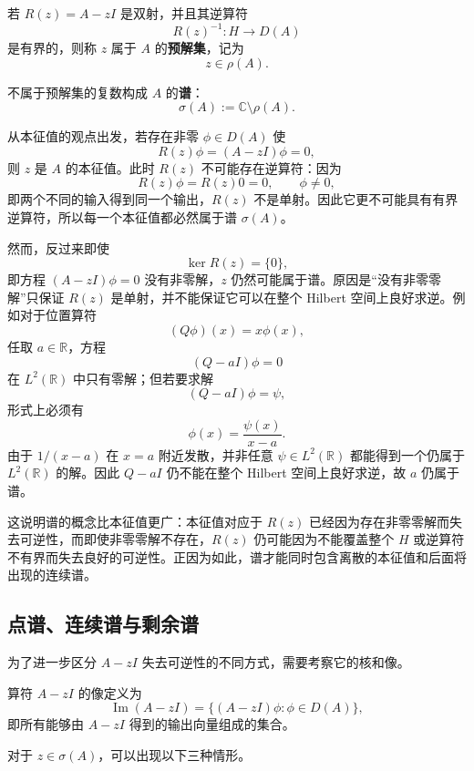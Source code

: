 \documentclass[UTF8,a4paper,11pt,openany]{ctexbook}
\begin{document}
\begin{definition}[预解集]
若 $R(z)=A-zI$ 是双射，并且其逆算符
\begin{equation}
    R(z)^{-1}:H\to D(A)
\end{equation}
是有界的，则称 $z$ 属于 $A$ 的\textbf{预解集}，记为
\[
z\in\rho(A).
\]
\end{definition}

\begin{definition}[谱]
不属于预解集的复数构成 $A$ 的\textbf{谱}：
\begin{equation}
    \sigma(A)
    :=
    \mathbb C\setminus\rho(A).
\end{equation}
\end{definition}

从本征值的观点出发，若存在非零 $\phi\in D(A)$ 使
\[
R(z)\phi=(A-zI)\phi=0,
\]
则 $z$ 是 $A$ 的本征值。此时 $R(z)$ 不可能存在逆算符：因为
\[
R(z)\phi=R(z)0=0,
\qquad \phi\neq0,
\]
即两个不同的输入得到同一个输出，$R(z)$ 不是单射。因此它更不可能具有有界逆算符，所以每一个本征值都必然属于谱 $\sigma(A)$。

然而，反过来即使
\[
\ker R(z)=\{0\},
\]
即方程 $(A-zI)\phi=0$ 没有非零解，$z$ 仍然可能属于谱。原因是“没有非零零解”只保证 $R(z)$ 是单射，并不能保证它可以在整个 Hilbert 空间上良好求逆。例如对于位置算符
\[
(Q\phi)(x)=x\phi(x),
\]
任取 $a\in\mathbb R$，方程
\[
(Q-aI)\phi=0
\]
在 $L^2(\mathbb R)$ 中只有零解；但若要求解
\[
(Q-aI)\phi=\psi,
\]
形式上必须有
\[
\phi(x)=\frac{\psi(x)}{x-a}.
\]
由于 $1/(x-a)$ 在 $x=a$ 附近发散，并非任意 $\psi\in L^2(\mathbb R)$ 都能得到一个仍属于 $L^2(\mathbb R)$ 的解。因此 $Q-aI$ 仍不能在整个 Hilbert 空间上良好求逆，故 $a$ 仍属于谱。

这说明谱的概念比本征值更广：本征值对应于 $R(z)$ 已经因为存在非零零解而失去可逆性，而即使非零零解不存在，$R(z)$ 仍可能因为不能覆盖整个 $H$ 或逆算符不有界而失去良好的可逆性。正因为如此，谱才能同时包含离散的本征值和后面将出现的连续谱。

\subsection{点谱、连续谱与剩余谱}

为了进一步区分 $A-zI$ 失去可逆性的不同方式，需要考察它的核和像。

算符 $A-zI$ 的像定义为
\[
\operatorname{Im}(A-zI)
=
\{(A-zI)\phi:\phi\in D(A)\},
\]
即所有能够由 $A-zI$ 得到的输出向量组成的集合。

对于 $z\in\sigma(A)$，可以出现以下三种情形。
\end{document}
